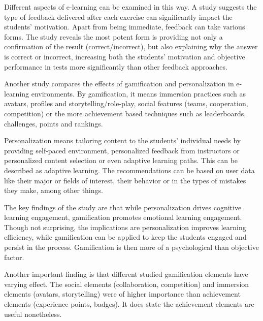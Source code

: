 
Different aspects of e-learning can be examined in this way. 
A study \cite{al2022effect} suggests the type of feedback delivered after each exercise can significantly impact the students' motivation. Apart from being immediate, feedback can take various forms. The study reveals the most potent form is providing not only a confirmation of the result (correct/incorrect), but also explaining why the answer is correct or incorrect, increasing both the students' motivation and objective performance in tests more significantly than other feedback approaches.

Another study \cite{gamification_personalization} compares the effects of gamification and personalization in e-learning environments. By gamification, it means immersion practices such as avatars, profiles and storytelling/role-play, social features (teams, cooperation, competition) or the more achievement based techniques such as leaderboards, challenges, points and rankings. 

Personalization means tailoring content to the students' individual needs by providing self-paced environment, personalized feedback from instructors or personalized content selection or even adaptive learning paths. This can be described as adaptive learning. The recommendations can be based on user data like their major or fields of interest, their behavior or in the types of mistakes they make, among other things.

The key findings of the study are that while personalization drives cognitive learning engagement, gamification promotes emotional learning engagement. Though not surprising, the implications are personalization improves learning efficiency, while gamification can be applied to keep the students engaged and persist in the process. Gamification is then more of a psychological than objective factor. 

Another important finding is that different studied gamification elements have varying effect. The social elements (collaboration, competition) and immersion elements (avatars, storytelling) were of higher importance than achievement elements (experience points, badges). It does state the achievement elements are useful nonetheless.

